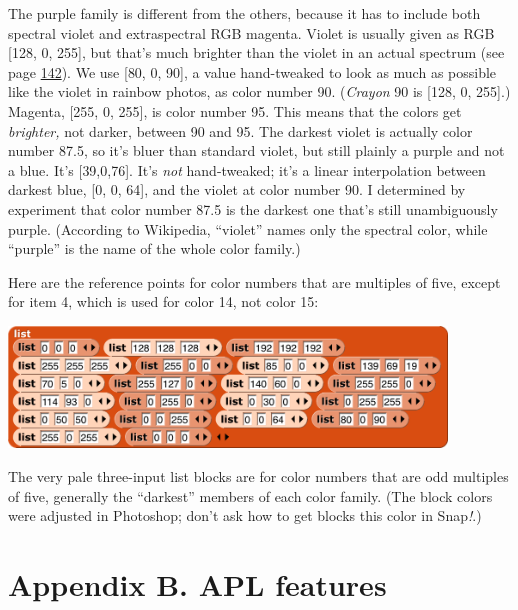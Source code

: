 The purple family is different from the others, because it has to
include both spectral violet and extraspectral RGB magenta. Violet is
usually given as RGB {[}128, 0, 255{]}, but that's much brighter than
the violet in an actual spectrum (see page \hyperref[rainbow]{142}). We
use {[}80, 0, 90{]}, a value hand-tweaked to look as much as possible
like the violet in rainbow photos, as color number 90. (\emph{Crayon} 90
is {[}128, 0, 255{]}.) Magenta, {[}255, 0, 255{]}, is color number 95.
This means that the colors get \emph{brighter,} not darker, between 90
and 95. The darkest violet is actually color number 87.5, so it's bluer
than standard violet, but still plainly a purple and not a blue. It's
{[}39,0,76{]}. It's \emph{not} hand-tweaked; it's a linear interpolation
between darkest blue, {[}0, 0, 64{]}, and the violet at color number 90.
I determined by experiment that color number 87.5 is the darkest one
that's still unambiguously purple. (According to Wikipedia, ``violet''
names only the spectral color, while ``purple'' is the name of the whole
color family.)

Here are the reference points for color numbers that are multiples of
five, except for item 4, which is used for color 14, not color 15:

\includegraphics[width=4.58333in,height=1.27778in]{media/image1262.png}

The very pale three-input list blocks are for color numbers that are odd
multiples of five, generally the ``darkest'' members of each color
family. (The block colors were adjusted in Photoshop; don't ask how to
get blocks this color in Snap\emph{!}.)

\section*{\texorpdfstring{\hfill\break
Appendix B. APL
features}{ Appendix B. APL features}}\label{appendix-b.-apl-features}

